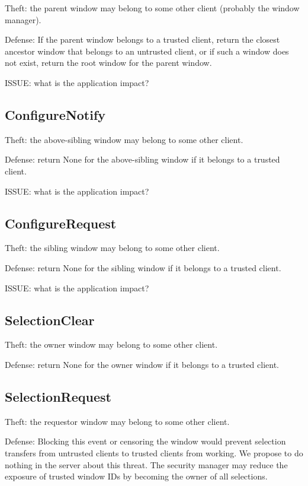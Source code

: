 Theft: the parent window may belong to some other client (probably
the window manager).

Defense: If the parent window belongs to a trusted client, return the
closest ancestor window that belongs to an untrusted client, or if
such a window does not exist, return the root window for the parent
window.

ISSUE: what is the application impact?


\subsection{ConfigureNotify}

Theft: the above-sibling window may belong to some other client.

Defense: return None for the above-sibling window if it belongs to a
trusted client.

ISSUE: what is the application impact?


\subsection{ConfigureRequest}

Theft: the sibling window may belong to some other client.

Defense: return None for the sibling window if it belongs to a trusted
client.

ISSUE: what is the application impact?


\subsection{SelectionClear}

Theft: the owner window may belong to some other client.

Defense: return None for the owner window if it belongs to a trusted
client.



\subsection{SelectionRequest}

Theft: the requestor window may belong to some other client.

Defense: Blocking this event or censoring the window would prevent
selection transfers from untrusted clients to trusted clients from
working.  We propose to do nothing in the server about this threat.
The security manager may reduce the exposure of trusted window IDs
by becoming the owner of all selections.



